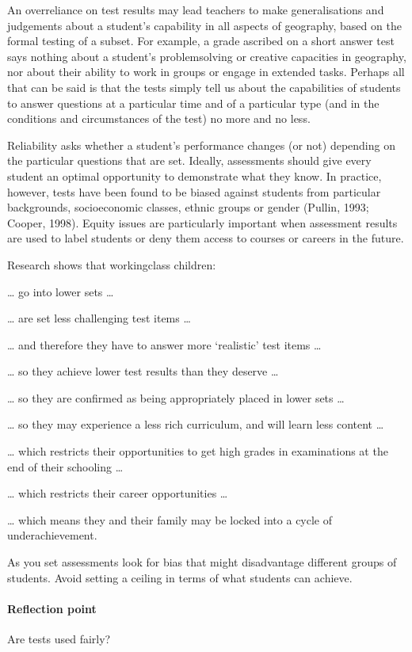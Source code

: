 \documentclass[letterpaper,10pt,english]{sphinxmanual}
\begin{document}
An over\sphinxhyphen{}reliance on test results may lead teachers to make generalisations and judgements about a student’s capability in all aspects of geography, based on the formal testing of a subset. For example, a grade ascribed on a short answer test says nothing about a student’s problem\sphinxhyphen{}solving or creative capacities in geography, nor about their ability to work in groups or engage in extended tasks. Perhaps all that can be said is that the tests simply tell us about the capabilities of students to
answer questions at a particular time and of a particular type (and in the conditions and circumstances of the test) \textendash{} no more and no less.

Reliability asks whether a student’s performance changes (or not) depending on the particular questions that are set. Ideally, assessments should give every student an optimal opportunity to demonstrate what they know. In practice, however, tests have been found to be biased against students from particular backgrounds, socio\sphinxhyphen{}economic classes, ethnic groups or gender (Pullin, 1993; Cooper, 1998). Equity issues are particularly important when assessment results are used to label students or deny
them access to courses or careers in the future.

Research shows that working\sphinxhyphen{}class children:

… go into lower sets …

… are set less challenging test items …

… and therefore they have to answer more ‘realistic’ test items …

… so they achieve lower test results than they deserve …

… so they are confirmed as being appropriately placed in lower sets …

… so they may experience a less rich curriculum, and will learn less content …

… which restricts their opportunities to get high grades in examinations at the end of their schooling …

… which restricts their career opportunities …

… which means they and their family may be locked into a cycle of underachievement.

As you set assessments look for bias that might disadvantage different groups of students. Avoid setting a ceiling in terms of what students can achieve.


\paragraph{Reflection point}
\label{\detokenize{content/session_00/Part_00_04:Reflection-point}}
Are tests used fairly?
\end{document}
